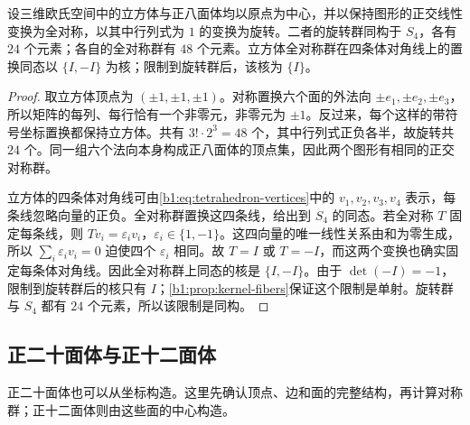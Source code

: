\begin{proposition}[立方体与正八面体]\label{b1:prop:cubic-rotation-group}
	设三维欧氏空间中的立方体与正八面体均以原点为中心，并以保持图形的正交线性变换为全对称，以其中行列式为 \(1\) 的变换为旋转。二者的旋转群同构于 \(S_4\)，各有 \(24\) 个元素；各自的全对称群有 \(48\) 个元素。立方体全对称群在四条体对角线上的置换同态以 \(\{I,-I\}\) 为核；限制到旋转群后，该核为 \(\{I\}\)。
\end{proposition}
\begin{proof}
	取立方体顶点为 \((\pm1,\pm1,\pm1)\)。对称置换六个面的外法向 \(\pm e_1,\pm e_2,\pm e_3\)，所以矩阵的每列、每行恰有一个非零元，非零元为 \(\pm1\)。反过来，每个这样的带符号坐标置换都保持立方体。共有 \(3!\cdot2^3=48\) 个，其中行列式正负各半，故旋转共 \(24\) 个。同一组六个法向本身构成正八面体的顶点集，因此两个图形有相同的正交对称群。

	立方体的四条体对角线可由\eqref{b1:eq:tetrahedron-vertices}中的 \(v_1,v_2,v_3,v_4\) 表示，每条线忽略向量的正负。全对称群置换这四条线，给出到 \(S_4\) 的同态。若全对称 \(T\) 固定每条线，则 \(Tv_i=\varepsilon_i v_i\)，\(\varepsilon_i\in\{1,-1\}\)。这四向量的唯一线性关系由和为零生成，所以 \(\sum_i\varepsilon_i v_i=0\) 迫使四个 \(\varepsilon_i\) 相同。故 \(T=I\) 或 \(T=-I\)，而这两个变换也确实固定每条体对角线。因此全对称群上同态的核是 \(\{I,-I\}\)。由于 \(\det(-I)=-1\)，限制到旋转群后的核只有 \(I\)；\cref{b1:prop:kernel-fibers}保证这个限制是单射。旋转群与 \(S_4\) 都有 \(24\) 个元素，所以该限制是同构。
\end{proof}

\subsection{正二十面体与正十二面体}
\label{b1:subsec:0304:icosahedron-dodecahedron}

正二十面体也可以从坐标构造。这里先确认顶点、边和面的完整结构，再计算对称群；正十二面体则由这些面的中心构造。

